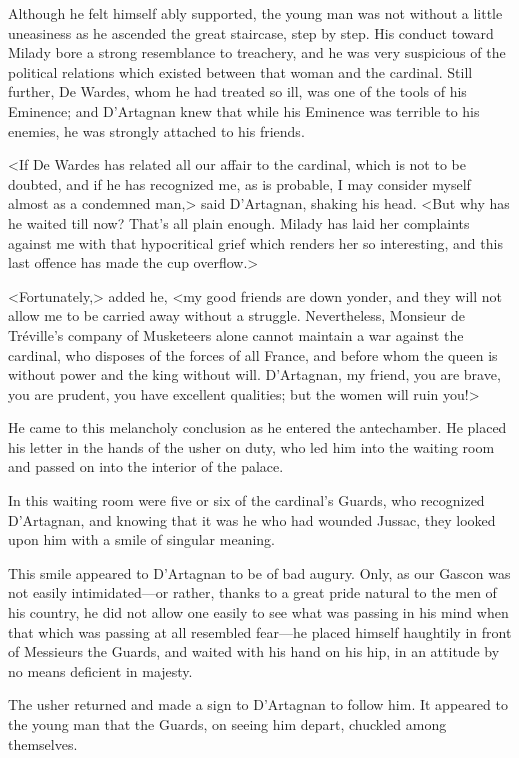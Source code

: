 Although he felt himself ably supported, the young man was not without a little uneasiness as he ascended the great staircase, step by step. His conduct toward Milady bore a strong resemblance to treachery, and he was very suspicious of the political relations which existed between that woman and the cardinal. Still further, De Wardes, whom he had treated so ill, was one of the tools of his Eminence; and D'Artagnan knew that while his Eminence was terrible to his enemies, he was strongly attached to his friends. 

<If De Wardes has related all our affair to the cardinal, which is not to be doubted, and if he has recognized me, as is probable, I may consider myself almost as a condemned man,> said D'Artagnan, shaking his head. <But why has he waited till now? That's all plain enough. Milady has laid her complaints against me with that hypocritical grief which renders her so interesting, and this last offence has made the cup overflow.> 

<Fortunately,> added he, <my good friends are down yonder, and they will not allow me to be carried away without a struggle. Nevertheless, Monsieur de Tréville's company of Musketeers alone cannot maintain a war against the cardinal, who disposes of the forces of all France, and before whom the queen is without power and the king without will. D'Artagnan, my friend, you are brave, you are prudent, you have excellent qualities; but the women will ruin you!> 

He came to this melancholy conclusion as he entered the antechamber. He placed his letter in the hands of the usher on duty, who led him into the waiting room and passed on into the interior of the palace. 

In this waiting room were five or six of the cardinal's Guards, who recognized D'Artagnan, and knowing that it was he who had wounded Jussac, they looked upon him with a smile of singular meaning. 

This smile appeared to D'Artagnan to be of bad augury. Only, as our Gascon was not easily intimidated—or rather, thanks to a great pride natural to the men of his country, he did not allow one easily to see what was passing in his mind when that which was passing at all resembled fear—he placed himself haughtily in front of Messieurs the Guards, and waited with his hand on his hip, in an attitude by no means deficient in majesty. 

The usher returned and made a sign to D'Artagnan to follow him. It appeared to the young man that the Guards, on seeing him depart, chuckled among themselves. 

